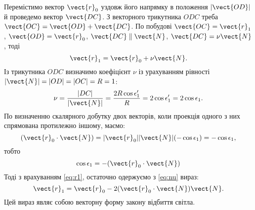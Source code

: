 \begin{solutionexample}
	Перемістимо вектор $\vect{r}_0$ уздовж його напрямку в положення $|\vect{OD}|$ й
	проведемо вектор $\vect{DC}$. З векторного трикутника $ODC$ треба  $\vect{OC} = \vect{OD} + \vect{DC} $.
	По побудові $\vect{OC} = \vect{r}_1$,  $\vect{OD} = \vect{r}_0$, $\vect{DC}  \parallel \vect{N}$, $\vect{DC} = \nu \vect{N} $, тоді
	\begin{equation}\label{eq:r1}
		\vect{r}_1 = \vect{r}_0 + \nu \vect{N}.
	\end{equation}
	Із трикутника $ODC$ визначимо коефіцієнт $\nu$ із урахуванням рівності
	$|\vect{N}| = |{OD}| = |{OC}| = R = 1$:
	\begin{equation}\label{eq:nu}
		\nu = \frac{|{DC}|}{|\vect{N}|} = \frac{2R\cos\epsilon'_1}{R} = 2\cos\epsilon'_1 = 2\cos\epsilon_1.
	\end{equation}
	По визначенню скалярного добутку двох векторів, коли проекція
	одного з них спрямована протилежно іншому, маємо:
	\begin{equation*}\label{}
		(\vect{r}_0 \cdot \vect{N}) = |\vect{r}_0| |\vect{N}| (-\cos\epsilon_1) = -\cos\epsilon_1,
	\end{equation*}
	тобто
	\begin{equation*}\label{}
		\cos\epsilon_1 = - (\vect{r}_0 \cdot \vect{N})
	\end{equation*}
	Тоді з врахуванням \eqref{eq:r1}, остаточно одержуємо з \eqref{eq:nu} вираз:
	\begin{equation*}\label{}
		\vect{r}_1 = \vect{r}_0 - 2 (\vect{r}_0 \cdot \vect{N}) \vect{N}.
	\end{equation*}
	Цей вираз являє собою векторну форму закону відбиття світла.
\end{solutionexample}


